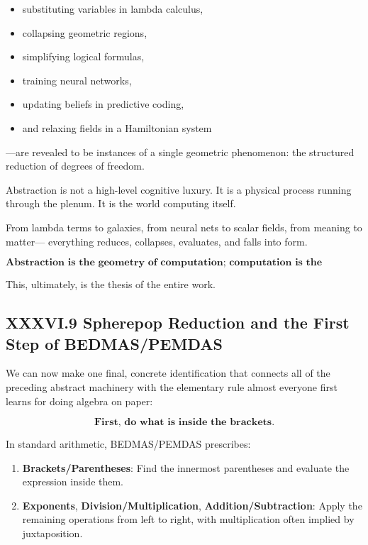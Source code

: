 \documentclass[12pt,letterpaper]{article}
\begin{document}
\begin{itemize}
    \item substituting variables in lambda calculus,
    \item collapsing geometric regions,
    \item simplifying logical formulas,
    \item training neural networks,
    \item updating beliefs in predictive coding,
    \item and relaxing fields in a Hamiltonian system
\end{itemize}

—are revealed to be instances of a single geometric phenomenon:
the structured reduction of degrees of freedom.

Abstraction is not a high-level cognitive luxury.  
It is a physical process running through the plenum.  
It is the world computing itself.

From lambda terms to galaxies,  
from neural nets to scalar fields,  
from meaning to matter—  
everything reduces, collapses, evaluates, and falls into form.

\[
\boxed{
\textbf{
Abstraction is the geometry of computation;  
computation is the geometry of meaning;  
meaning is the geometry of the plenum.}
}
\]

This, ultimately, is the thesis of the entire work.
\newpage

\subsection{XXXVI.9 Spherepop Reduction and the First Step of BEDMAS/PEMDAS}

We can now make one final, concrete identification that connects all of the
preceding abstract machinery with the elementary rule almost everyone first
learns for doing algebra on paper:

\[
\textbf{First, do what is inside the brackets.}
\]

In standard arithmetic, BEDMAS/PEMDAS prescribes:

\begin{enumerate}
  \item \textbf{Brackets/Parentheses}: Find the innermost parentheses and evaluate the expression inside them.
  \item \textbf{Exponents}, \textbf{Division/Multiplication}, \textbf{Addition/Subtraction}: Apply the remaining operations from left to right, with multiplication often implied by juxtaposition.
\end{enumerate}
\end{document}
